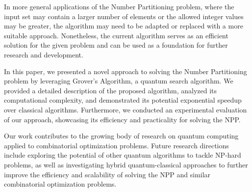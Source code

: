 In more general applications of the Number Partitioning problem, where the input set may contain a larger number of elements or the allowed integer values may be greater, the algorithm may need to be adapted or replaced with a more suitable approach. Nonetheless, the current algorithm serves as an efficient solution for the given problem and can be used as a foundation for further research and development.

In this paper, we presented a novel approach to solving the Number Partitioning problem by leveraging Grover's Algorithm, a quantum search algorithm. We provided a detailed description of the proposed algorithm, analyzed its computational complexity, and demonstrated its potential exponential speedup over classical algorithms. Furthermore, we conducted an experimental evaluation of our approach, showcasing its efficiency and practicality for solving the NPP.

Our work contributes to the growing body of research on quantum computing applied to combinatorial optimization problems. Future research directions include exploring the potential of other quantum algorithms to tackle NP-hard problems, as well as investigating hybrid quantum-classical approaches to further improve the efficiency and scalability of solving the NPP and similar combinatorial optimization problems.


